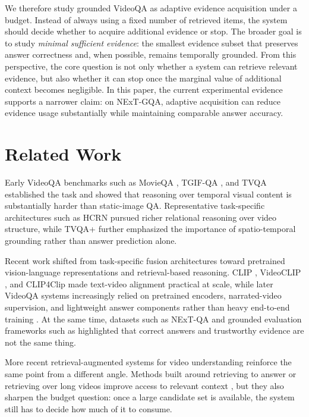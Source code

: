 \documentclass{article}
\begin{document}
We therefore study grounded VideoQA as adaptive evidence acquisition under a budget. Instead of always using a fixed number of retrieved items, the system should decide whether to acquire additional evidence or stop. The broader goal is to study \emph{minimal sufficient evidence}: the smallest evidence subset that preserves answer correctness and, when possible, remains temporally grounded. From this perspective, the core question is not only whether a system can retrieve relevant evidence, but also whether it can stop once the marginal value of additional context becomes negligible. In this paper, the current experimental evidence supports a narrower claim: on NExT-GQA, adaptive acquisition can reduce evidence usage substantially while maintaining comparable answer accuracy.

\section{Related Work}
Early VideoQA benchmarks such as MovieQA \citep{tapaswi2016movieqa}, TGIF-QA \citep{jang2017tgifqa}, and TVQA \citep{lei2018tvqa} established the task and showed that reasoning over temporal visual content is substantially harder than static-image QA. Representative task-specific architectures such as HCRN \citep{le2020hcrn} pursued richer relational reasoning over video structure, while TVQA+ \citep{lei2019tvqaplus} further emphasized the importance of spatio-temporal grounding rather than answer prediction alone.

Recent work shifted from task-specific fusion architectures toward pretrained vision-language representations and retrieval-based reasoning. CLIP \citep{radford2021clip}, VideoCLIP \citep{xu2021videoclip}, and CLIP4Clip \citep{luo2021clip4clip} made text-video alignment practical at scale, while later VideoQA systems increasingly relied on pretrained encoders, narrated-video supervision, and lightweight answer components rather than heavy end-to-end training \citep{yang2021justask,yang2022frozenbilm}. At the same time, datasets such as NExT-QA \citep{xiao2021nextqa} and grounded evaluation frameworks such as \citet{xiao2023trust} highlighted that correct answers and trustworthy evidence are not the same thing.

More recent retrieval-augmented systems for video understanding reinforce the same point from a different angle. Methods built around retrieving to answer or retrieving over long videos improve access to relevant context \citep{pan2023r2a,luo2024videorag,jeong2025videorag,yeo2025universalrag}, but they also sharpen the budget question: once a large candidate set is available, the system still has to decide how much of it to consume.
\end{document}
